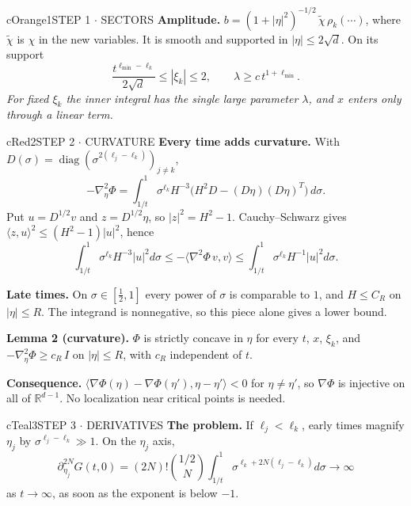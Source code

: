 \documentclass[10pt]{article}
\newcommand{\R}{\mathbb{R}}
\newcommand{\lab}[2]{\textbf{\color{#1}#2}}
\newcommand{\remk}[2]{{\color{#1}\itshape #2}}
\begin{document}
\begin{minipage}[t][49.0cm][t]{0.322\textwidth}
\begin{panel}{cOrange}{1}{STEP 1 $\cdot$ SECTORS}
\lab{cOrange}{Amplitude.} $b=(1+|\eta|^2)^{-1/2}\,\tilde\chi\,\rho_k(\cdots)$, where
$\tilde\chi$ is $\chi$ in the new variables. It is smooth and supported in $|\eta|\le2\sqrt d$.
On its support
\[
\frac{t^{\ell_{\min}-\ell_k}}{2\sqrt d}\le|\xi_k|\le2,\qquad \lambda\ge c\,t^{1+\ell_{\min}} .
\]
\remk{cOrange}{For fixed $\xi_k$ the inner integral has the single large parameter $\lambda$,
and $x$ enters only through a linear term.}
\end{panel}
\vfill
\begin{panel}{cRed}{2}{STEP 2 $\cdot$ CURVATURE}
\lab{cRed}{Every time adds curvature.} With $D(\sigma)=\operatorname{diag}(\sigma^{2(\ell_j-\ell_k)})_{j\ne k}$,
\[
-\nabla_\eta^2\Phi=\int_{1/t}^1\sigma^{\ell_k}H^{-3}\big(H^2D-(D\eta)(D\eta)^T\big)\,d\sigma .
\]
Put $u=D^{1/2}v$ and $z=D^{1/2}\eta$, so $|z|^2=H^2-1$. Cauchy--Schwarz gives
$\langle z,u\rangle^2\le(H^2-1)|u|^2$, hence
\[
\int_{1/t}^1\!\sigma^{\ell_k}H^{-3}|u|^2d\sigma\le-\langle\nabla^2\Phi\,v,v\rangle
\le\int_{1/t}^1\!\sigma^{\ell_k}H^{-1}|u|^2d\sigma .
\]
\begin{minipage}[c]{0.6\linewidth}
\lab{cRed}{Late times.} On $\sigma\in[\tfrac12,1]$ every power of $\sigma$ is comparable to
$1$, and $H\le C_R$ on $|\eta|\le R$. The integrand is nonnegative, so this piece alone gives
a lower bound.
\end{minipage}\hfill
\begin{minipage}[c]{0.37\linewidth}\centering
{}
\end{minipage}
\begin{keybox}[cRed]
\lab{cRed}{Lemma 2 (curvature).} $\Phi$ is strictly concave in $\eta$ for every $t$, $x$,
$\xi_k$, and $-\nabla_\eta^2\Phi\ge c_R\,I$ on $|\eta|\le R$, with $c_R$ independent of $t$.
\end{keybox}
\lab{cRed}{Consequence.} $\langle\nabla\Phi(\eta)-\nabla\Phi(\eta'),\eta-\eta'\rangle<0$ for
$\eta\ne\eta'$, so $\nabla\Phi$ is injective on all of $\R^{d-1}$. No localization near
critical points is needed.
\end{panel}
\vfill
\begin{panel}{cTeal}{3}{STEP 3 $\cdot$ DERIVATIVES}
\lab{cTeal}{The problem.} If $\ell_j<\ell_k$, early times magnify $\eta_j$ by
$\sigma^{\ell_j-\ell_k}\gg1$. On the $\eta_j$ axis,
\[
\partial_{\eta_j}^{2N}G(t,0)=(2N)!\binom{1/2}{N}\int_{1/t}^1\sigma^{\ell_k+2N(\ell_j-\ell_k)}d\sigma
\to\infty
\]
as $t\to\infty$, as soon as the exponent is below $-1$.


\end{panel}
\end{minipage}
\end{document}
